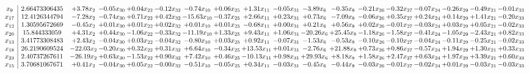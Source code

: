 \documentclass[9pt]{article}
\begin{document}
 \[\begin{array}{c| c c@{\hskip 2pt} c@{\hskip 2pt} c@{\hskip 2pt} c@{\hskip 2pt} c@{\hskip 2pt} c@{\hskip 2pt} c@{\hskip 2pt} c@{\hskip 2pt} c@{\hskip 2pt} c@{\hskip 2pt} c@{\hskip 2pt} c@{\hskip 2pt} c@{\hskip 2pt} c@{\hskip 2pt} c@{\hskip 2pt} c@{\hskip 2pt} }
 x_{9}   &  2.66473306435 & +  3.78 x_{2} & -0.05 x_{30} & +  0.04 x_{22} & -0.12 x_{32} & -0.74 x_{10} & +  0.06 x_{25} & +  1.31 x_{11} & -0.05 x_{31} & -3.89 x_{6} & -0.35 x_{8} & -0.21 x_{26} & -0.32 x_{27} & -0.07 x_{24} & -0.26 x_{29} & -0.49 x_{21} & -0.01 x_{33}\\
 x_{17}   &  12.4126344794 & -7.28 x_{2} & -0.74 x_{30} & +  0.71 x_{22} & +  0.42 x_{32} & -15.63 x_{10} & -0.37 x_{25} & +  2.66 x_{11} & +  0.23 x_{31} & +  0.73 x_{6} & -7.09 x_{8} & -0.06 x_{26} & +  0.35 x_{27} & +  0.24 x_{24} & +  0.14 x_{29} & +  1.41 x_{21} & -0.20 x_{33}\\
 x_{12}   &  1.30595672669 & -0.45 x_{2} & +  0.01 x_{30} & +  0.01 x_{22} & +  0.02 x_{32} & +  0.01 x_{10} & +  0.01 x_{25} & -0.68 x_{11} & +  0.00 x_{31} & +  0.21 x_{6} & +  0.56 x_{8} & +  0.02 x_{26} & -0.01 x_{27} & -0.03 x_{24} & +  0.03 x_{29} & +  0.05 x_{21} & -0.02 x_{33}\\
 x_{20}   &  15.844333059 & +  4.31 x_{2} & +  0.44 x_{30} & -1.06 x_{22} & -0.33 x_{32} & -11.19 x_{10} & +  1.33 x_{25} & +  9.43 x_{11} & +  1.06 x_{31} & -20.26 x_{6} & + 25.45 x_{8} & -1.18 x_{26} & -1.58 x_{27} & -0.41 x_{24} & -1.05 x_{29} & -2.43 x_{21} & +  0.82 x_{33}\\
 x_{13}   &  3.41773308483 & +  2.43 x_{2} & -0.04 x_{30} & +  0.03 x_{22} & -0.04 x_{32} & -0.80 x_{10} & +  0.03 x_{25} & +  0.92 x_{11} & -0.07 x_{31} & -1.53 x_{6} & -0.53 x_{8} & -0.10 x_{26} & -0.10 x_{27} & -0.04 x_{24} & -0.11 x_{29} & -0.25 x_{21} & -0.02 x_{33}\\
 x_{18}   &  26.2190609524 & -22.03 x_{2} & -0.20 x_{30} & +  0.32 x_{22} & +  0.31 x_{32} & +  6.64 x_{10} & -0.34 x_{25} & + 13.53 x_{11} & +  0.01 x_{31} & -2.76 x_{6} & + 21.88 x_{8} & +  0.73 x_{26} & +  0.86 x_{27} & -0.57 x_{24} & +  1.94 x_{29} & +  1.30 x_{21} & +  0.33 x_{33}\\
 x_{23}   &  2.40737267611 & -26.19 x_{2} & +  0.63 x_{30} & -1.53 x_{22} & +  0.90 x_{32} & +  7.42 x_{10} & +  0.46 x_{25} & -10.13 x_{11} & +  0.98 x_{31} & + 29.93 x_{6} & +  8.18 x_{8} & +  1.58 x_{26} & +  2.47 x_{27} & +  0.63 x_{24} & +  1.97 x_{29} & +  3.39 x_{21} & +  0.60 x_{33}\\
 x_{15}   &  3.70681067671 & +  0.41 x_{2} & -0.04 x_{30} & +  0.05 x_{22} & -0.00 x_{32} & -0.51 x_{10} & -0.05 x_{25} & +  0.34 x_{11} & -0.03 x_{31} & -0.45 x_{6} & -0.44 x_{8} & -0.03 x_{26} & -0.01 x_{27} & -0.02 x_{24} & +  0.01 x_{29} & -0.03 x_{21} & -0.03 x_{33}\\

\end{array}\]
\end{document}
